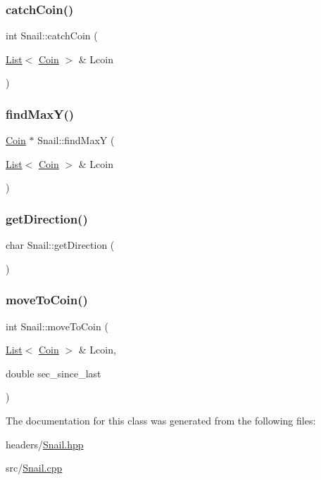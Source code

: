\subsubsection{\texorpdfstring{catch\+Coin()}{catchCoin()}}
{\footnotesize\ttfamily int Snail\+::catch\+Coin (\begin{DoxyParamCaption}\item[{\mbox{\hyperlink{class_list}{List}}$<$ \mbox{\hyperlink{class_coin}{Coin}} $>$ \&}]{Lcoin }\end{DoxyParamCaption})}

\mbox{\label{class_snail_a1dd9e6d2229dfc452f0163948c7f1980}} 
\subsubsection{\texorpdfstring{find\+Max\+Y()}{findMaxY()}}
{\footnotesize\ttfamily \mbox{\hyperlink{class_coin}{Coin}} $\ast$ Snail\+::find\+MaxY (\begin{DoxyParamCaption}\item[{\mbox{\hyperlink{class_list}{List}}$<$ \mbox{\hyperlink{class_coin}{Coin}} $>$ \&}]{Lcoin }\end{DoxyParamCaption})}

\mbox{\label{class_snail_a5b4774b31b0eb0253910680d4e49f403}} 
\subsubsection{\texorpdfstring{get\+Direction()}{getDirection()}}
{\footnotesize\ttfamily char Snail\+::get\+Direction (\begin{DoxyParamCaption}{ }\end{DoxyParamCaption})}

\mbox{\label{class_snail_ac02f07964ad0a0db28204acc7ed294b7}} 
\subsubsection{\texorpdfstring{move\+To\+Coin()}{moveToCoin()}}
{\footnotesize\ttfamily int Snail\+::move\+To\+Coin (\begin{DoxyParamCaption}\item[{\mbox{\hyperlink{class_list}{List}}$<$ \mbox{\hyperlink{class_coin}{Coin}} $>$ \&}]{Lcoin,  }\item[{double}]{sec\+\_\+since\+\_\+last }\end{DoxyParamCaption})}



The documentation for this class was generated from the following files\+:\begin{DoxyCompactItemize}
\item 
headers/\mbox{\hyperlink{_snail_8hpp}{Snail.\+hpp}}\item 
src/\mbox{\hyperlink{_snail_8cpp}{Snail.\+cpp}}\end{DoxyCompactItemize}
